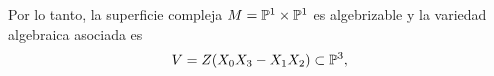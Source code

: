 \begin{example}
		Por lo tanto, la superficie compleja $M=\mathbb{P}^1\times\mathbb{P}^1$ es algebrizable y la variedad algebraica asociada es
		\begin{equation*}
			V=Z(X_0X_3-X_1X_2)\subset\mathbb{P}^3,
		\end{equation*}
			
%			
%			

	\end{example}


